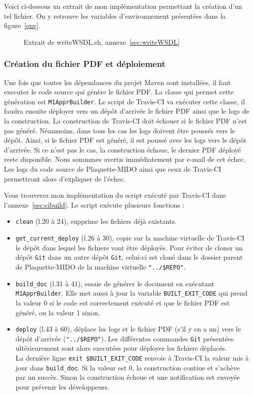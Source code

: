 Voici ci-dessous un extrait de mon implémentation permettant la création d'un tel fichier. On y retrouve les variables d'environnement présentées dans la figure~\ref{env}.

\begin{figure}[!ht]
    
    \caption*{Extrait de writeWSDL.sh, annexe~\ref{sec:writeWSDL} }
\end{figure}

\subsubsection*{Création du fichier PDF et déploiement}
Une fois que toutes les dépendances du projet Maven sont installées, il faut executer le code source qui génère le fichier PDF. La classe qui permet cette génération est \texttt{M1ApprBuilder}. Le script de Travis-CI va exécuter cette classe, il faudra ensuite déployer vers un dépôt d'arrivée le fichier PDF ainsi que le logs de la construction. La construction de Travis-CI doit échouer si le fichier PDF n'est pas généré. Néanmoins, dans tous les cas les logs doivent être poussés vers le dépôt. Ainsi, si le fichier PDF est généré, il est poussé avec les logs vers le dépôt d'arrivée. Si ce n'est pas le cas, la construction échoue, le dernier PDF déployé reste disponible. Nous sommmes avertis immédiatement par e-mail de cet échec. Les logs du code source de Plaquette-MIDO ainsi que ceux de Travis-CI permettront alors d'expliquer de l'échec.

Vous trouverez mon implémentation du script exécuté par Travis-CI dans l'annexe~\ref{sec:cibuild}. Le script exécute plusieurs fonctions :

\begin{itemize}
    \item \texttt{clean} (l.20 à 24), supprime les fichiers déjà existants.
    \item \texttt{get\_current\_deploy} (l.26 à 30), copie sur la machine virtuelle de Travis-CI le dépôt dans lequel les fichiers vont être déployés. Pour éviter de cloner un dépôt \texttt{Git} dans un autre dépôt \texttt{Git}, celui-ci est cloné dans le dossier parent de Plaquette-MIDO de la machine virtuelle \texttt{"../\${REPO}"}.
    \item \texttt{build\_doc} (l.31 à 41), essaie de générer le document en exécutant \texttt{M1ApprBuilder}. Elle met aussi à jour la variable \texttt{BUILT\_EXIT\_CODE} qui prend la valeur 0 si le code est correctement exécuté et que le fichier PDF est généré, ou la valeur 1 sinon.
    \item \texttt{deploy} (l.43 à 60), déplace les logs et le fichier PDF (s'il y en a un) vers le dépôt d'arrivée (\texttt{"../\${REPO}"}). Les différentes commandes \texttt{Git} présentées ultérieurement sont alors executées pour déployer les fichiers déplacés.\\ La dernière ligne \texttt{exit \${BUILT\_EXIT\_CODE}} renvoie à Travis-CI la valeur mis à jour dans \texttt{build\_doc}. Si la valeur est 0, la construction contiue et s'achève par un succès. Sinon la construction échoue et une notification est envoyée pour prévenir les développeurs.
\end{itemize}


